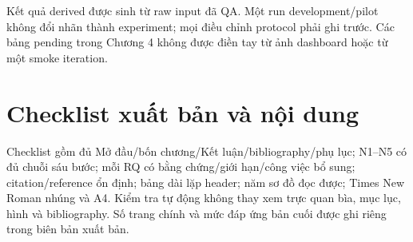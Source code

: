 Kết quả derived được sinh từ raw input đã QA. Một run development\slash pilot không đổi nhãn thành experiment; mọi điều chỉnh protocol phải ghi trước. Các bảng pending trong Chương 4 không được điền tay từ ảnh dashboard hoặc từ một smoke iteration.

\section{Checklist xuất bản và nội dung}
Checklist gồm đủ Mở đầu\slash bốn chương\slash Kết luận\slash bibliography\slash phụ lục; N1--N5 có đủ chuỗi sáu bước; mỗi RQ có bằng chứng\slash giới hạn\slash công việc bổ sung; citation\slash reference ổn định; bảng dài lặp header; năm sơ đồ đọc được; Times New Roman nhúng và A4. Kiểm tra tự động không thay xem trực quan bìa, mục lục, hình và bibliography. Số trang chính và mức đáp ứng bản cuối được ghi riêng trong biên bản xuất bản.
